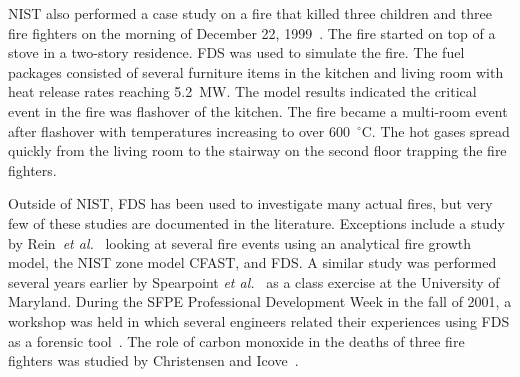 NIST also performed a case study on a fire that killed three children and three fire fighters on the morning of December 22, 1999~\cite{Iowa}. The
fire started on top of a stove in a two-story residence. FDS was used to simulate the fire.  The fuel packages consisted of several furniture items
in the kitchen and living room with heat release rates reaching 5.2~MW. The model results indicated the critical event in the fire was flashover of
the kitchen. The fire became a multi-room event after flashover with temperatures increasing to over 600~$^\circ$C. The hot gases spread quickly from
the living room to the stairway on the second floor trapping the fire fighters.

Outside of NIST, FDS has been used to investigate many actual fires, but very few of these studies are documented in the literature. Exceptions
include a study by Rein~{\em et al.}~\cite{Rein:Interflam2004} looking at several fire events using an analytical fire growth model, the NIST zone
model CFAST, and FDS. A similar study was performed several years earlier by Spearpoint {\em et al.}~\cite{Spearpoint:ICFRE3} as a class exercise at
the University of Maryland. During the SFPE Professional Development Week in the fall of 2001, a workshop was held in which several engineers related
their experiences using FDS as a forensic tool~\cite{Carpenter:SFPE2001}. The role of carbon monoxide in the deaths of three fire fighters was
studied by Christensen and Icove~\cite{Christensen:JFS}.
